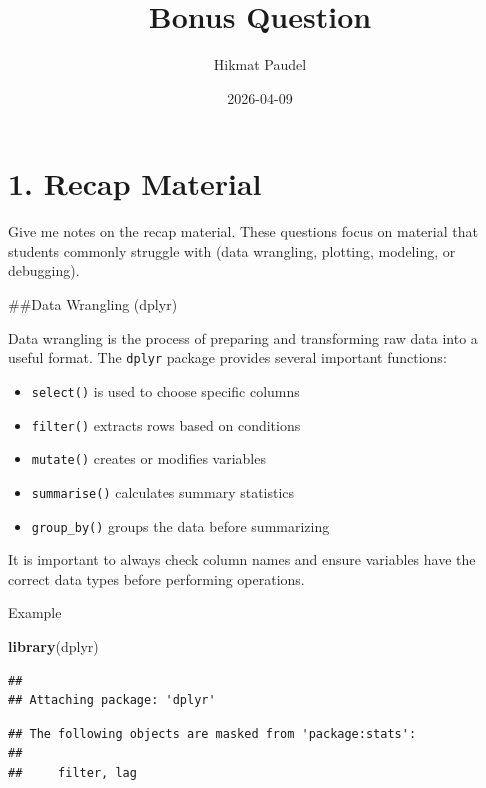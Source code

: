 \documentclass[
]{article}
\title{Bonus Question}
\author{Hikmat Paudel}
\date{2026-04-09}
\newenvironment{Shaded}{\begin{snugshade}}{\end{snugshade}}
\newcommand{\FunctionTok}[1]{\textcolor[rgb]{0.13,0.29,0.53}{\textbf{#1}}}
\newcommand{\NormalTok}[1]{#1}
\providecommand{\tightlist}{%
  \setlength{\itemsep}{0pt}\setlength{\parskip}{0pt}}
\begin{document}
\maketitle

\section{1. Recap Material}\label{recap-material}

Give me notes on the recap material. These questions focus on material
that students commonly struggle with (data wrangling, plotting,
modeling, or debugging).

\#\#Data Wrangling (dplyr)

Data wrangling is the process of preparing and transforming raw data
into a useful format. The \texttt{dplyr} package provides several
important functions:

\begin{itemize}
\tightlist
\item
  \texttt{select()} is used to choose specific columns\\
\item
  \texttt{filter()} extracts rows based on conditions\\
\item
  \texttt{mutate()} creates or modifies variables\\
\item
  \texttt{summarise()} calculates summary statistics\\
\item
  \texttt{group\_by()} groups the data before summarizing
\end{itemize}

It is important to always check column names and ensure variables have
the correct data types before performing operations.

Example

\begin{Shaded}
\begin{Highlighting}[]
\FunctionTok{library}\NormalTok{(dplyr)}
\end{Highlighting}
\end{Shaded}

\begin{verbatim}
## 
## Attaching package: 'dplyr'
\end{verbatim}

\begin{verbatim}
## The following objects are masked from 'package:stats':
## 
##     filter, lag
\end{verbatim}
\end{document}
